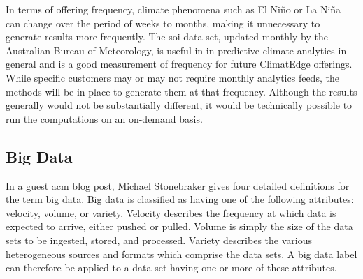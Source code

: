 In terms of offering frequency, climate phenomena such as El Niño or La Niña can change over the period of weeks to months, making it unnecessary to generate results more frequently. The \gls{soi} data set, updated monthly by the Australian Bureau of Meteorology, is useful in in predictive climate analytics in general and is a good measurement of frequency for future ClimatEdge offerings. While specific customers may or may not require monthly analytics feeds, the methods will be in place to generate them at that frequency. Although the results generally would not be substantially different, it would be technically possible to run the computations on an on-demand basis.
\subsection{Big Data}
In a guest \gls{acm}  blog post, Michael Stonebraker gives four detailed definitions for the term big data\cite{stonebraker}.  Big data is classified as having one of the following attributes: velocity, volume, or variety.  Velocity describes the frequency at which data is expected to arrive, either pushed or pulled. Volume is simply the size of the data sets to be ingested, stored, and processed. Variety describes the various heterogeneous sources and formats which comprise the data sets. A big data label can therefore be applied to a data set having  one or more of these attributes.\\


